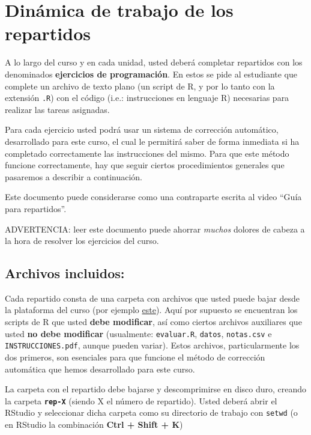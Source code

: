 \documentclass[]{article}
\begin{document}
\section{Dinámica de trabajo de los repartidos}

A lo largo del curso y en cada unidad, usted deberá completar repartidos
con los denominados \textbf{ejercicios de programación}. En estos se
pide al estudiante que complete un archivo de texto plano (un script de
R, y por lo tanto con la extensión \texttt{.R}) con el código (i.e.:
instrucciones en lenguaje R) necesarias para realizar las tareas
asignadas.

Para cada ejercicio usted podrá usar un sistema de corrección
automático, desarrollado para este curso, el cual le permitirá saber de
forma inmediata si ha completado correctamente las instrucciones del
mismo. Para que este método funcione correctamente, hay que seguir
ciertos procedimientos generales que pasaremos a describir a
continuación.

Este documento puede considerarse como una contraparte escrita al video
``Guía para repartidos''.

ADVERTENCIA: leer este documento puede ahorrar \emph{muchos} dolores de
cabeza a la hora de resolver los ejercicios del curso.

\subsection{Archivos incluidos:}

Cada repartido consta de una carpeta con archivos que usted puede bajar
desde la plataforma del curso (por ejemplo
\href{http://eva.universidad.edu.uy/file.php/1454/ejercicios\_de\_programacion/rep-1.zip}{este}).
Aquí por supuesto se encuentran los scripts de R que usted \textbf{debe
modificar}, así como ciertos archivos auxiliares que usted \textbf{no
debe modificar} (usualmente: \texttt{evaluar.R}, \texttt{datos},
\texttt{notas.csv} e \texttt{INSTRUCCIONES.pdf}, aunque pueden variar).
Estos archivos, particularmente los dos primeros, son esenciales para
que funcione el método de corrección automática que hemos desarrollado
para este curso.

La carpeta con el repartido debe bajarse y descomprimirse en disco duro,
creando la carpeta \textbf{\texttt{rep-X}} (siendo X el número de
repartido). Usted deberá abrir el RStudio y seleccionar dicha carpeta
como su directorio de trabajo con \texttt{setwd} (o en RStudio la
combinación \textbf{Ctrl + Shift + K})
\end{document}
